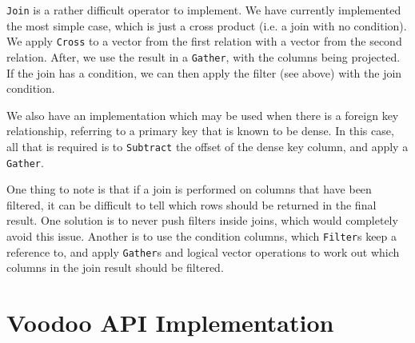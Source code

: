 \begin{enumerate}
    \texttt{Join} is a rather difficult operator to implement. We have currently implemented the most simple case, which is just a cross product (i.e. a join with no condition). We apply \texttt{Cross} to a vector from the first relation with a vector from the second relation. After, we use the result in a \texttt{Gather}, with the columns being projected. If the join has a condition, we can then apply the filter (see above) with the join condition.
    
    We also have an implementation which may be used when there is a foreign key relationship, referring to a primary key that is known to be dense. In this case, all that is required is to \texttt{Subtract} the offset of the dense key column, and apply a \texttt{Gather}.
    
    One thing to note is that if a join is performed on columns that have been filtered, it can be difficult to tell which rows should be returned in the final result. One solution is to never push filters inside joins, which would completely avoid this issue. Another is to use the condition columns, which \texttt{Filter}s keep a reference to, and apply \texttt{Gather}s and logical vector operations to work out which columns in the join result should be filtered.
    
\end{enumerate}

\chapter{Voodoo API Implementation}
\label{appendix:api}

